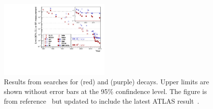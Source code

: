 {{\begin{figure}[htbp]
    \centering
        \includegraphics[width=0.49\textwidth]{./Figs/Introduction/CMSLHCb_EDfig7.pdf}
    \caption{Results from searches for \bdmumu (red) and \bsmumu (purple) decays. Upper limits are shown without error bars at the 95$\%$ confindence level. The figure is from reference~\cite{CMS:2014xfa} but updated to include the latest ATLAS result~\cite{Aaboud:2016ire}.}
    \label{fig:bmumu_history}
\end{figure}

}}
